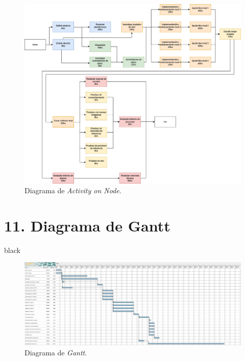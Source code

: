 \documentclass[
11pt, %
]{charter}
\begin{document}
\begin{figure}[htpb]
\centering 
\includegraphics[width=.99\textwidth]{./Figuras/AoN finalv2.png}
\caption{Diagrama de \textit{Activity on Node}.}
\label{fig:AoN2}
\end{figure}


\section{11. Diagrama de Gantt}
\label{sec:gantt}

\begin{consigna}{black}

\begin{landscape}
\vspace*{50px}

\begin{figure}[htpb]
\centering 
\begin{center}
\includegraphics[height=.6\textwidth]{./Figuras/Untitled Project 4.png}
\caption{Diagrama de \textit{Gantt}.}
\label{fig:Gantt}
\end{center}
\end{figure}
\end{landscape}


\end{consigna}
\end{document}
